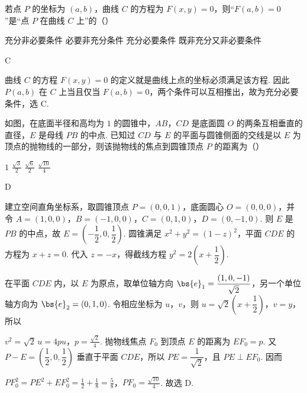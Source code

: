 \begin{problem}
若点 \(P\) 的坐标为 \((a,b)\)，曲线 \(C\) 的方程为 \(F(x,y)=0\)，则“\(F(a,b)=0\)”是“点 \(P\) 在曲线 \(C\) 上”的（\quad）

\choices
    {充分非必要条件}
    {必要非充分条件}
    {充分必要条件}
    {既非充分又非必要条件}
\end{problem}

\begin{answer}
C
\end{answer}

\begin{solution}
曲线 \(C\) 的方程 \(F(x,y)=0\) 的定义就是曲线上点的坐标必须满足该方程. 因此 \(P(a,b)\) 在 \(C\) 上当且仅当 \(F(a,b)=0\)，两个条件可以互相推出，故为充分必要条件，选 C.
\end{solution}

\begin{problem}
如图，在底面半径和高均为 \(1\) 的圆锥中，\(AB\)，\(CD\) 是底面圆 \(O\) 的两条互相垂直的直径，\(E\) 是母线 \(PB\) 的中点. 已知过 \(CD\) 与 \(E\) 的平面与圆锥侧面的交线是以 \(E\) 为顶点的抛物线的一部分，则该抛物线的焦点到圆锥顶点 \(P\) 的距离为（\quad）


\choices
    {\(1\)}
    {\( \frac{\sqrt{3}}{2} \)}
    {\( \frac{\sqrt{6}}{2} \)}
    {\( \frac{\sqrt{10}}{4} \)}
\end{problem}

\begin{answer}
D
\end{answer}

\begin{solution}
建立空间直角坐标系，取圆锥顶点 \(P=(0,0,1)\)，底面圆心 \(O=(0,0,0)\)，并令 \(A=(1,0,0)\)，\(B=(-1,0,0)\)，\(C=(0,1,0)\)，\(D=(0,-1,0)\). 则 \(E\) 是 \(PB\) 的中点，故 \(E=\left(-\dfrac12,0,\dfrac12\right)\). 圆锥满足 \(x^2+y^2=(1-z)^2\)，平面 \(CDE\) 的方程为 \(x+z=0\). 代入 \(z=-x\)，得截线方程 \(y^2=2\left(x+\dfrac12\right)\).

在平面 \(CDE\) 内，以 \(E\) 为原点，取单位轴方向 \(\bs{e}_1=\dfrac{(1,0,-1)}{\sqrt2}\)，另一个单位轴方向为 \(\bs{e}_2=(0,1,0)\). 令相应坐标为 \(u\)，\(v\)，则 \(u=\sqrt2\left(x+\dfrac12\right)\)，\(v=y\)，所以

\(v^2=\sqrt2\,u=4pu\)，\(p=\frac{\sqrt2}{4}\).
抛物线焦点 \(F_0\) 到顶点 \(E\) 的距离为 \(EF_0=p\). 又 \(P-E=\left(\dfrac12,0,\dfrac12\right)\) 垂直于平面 \(CDE\)，所以 \(PE=\dfrac1{\sqrt2}\)，且 \(PE\perp EF_0\). 因而

\(PF_0^2=PE^2+EF_0^2=\frac12+\frac18=\frac58\)，\(PF_0=\frac{\sqrt{10}}4\).
故选 D.
\end{solution}

